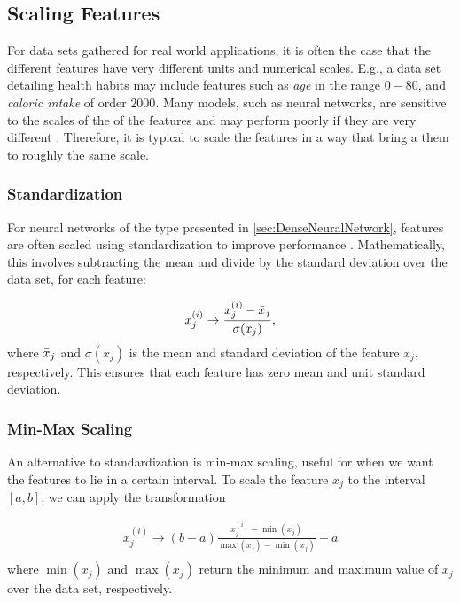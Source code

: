 \subsection{Scaling Features}\label{sec:Scaling Features}
For data sets gathered for real world applications, it is often the case that the different features have very different units and numerical scales. E.g., a data set detailing health habits may include features such as \emph{age} in the range $0-80$, and \emph{caloric intake} of order $2000$. Many models, such as neural networks, are sensitive to the scales of the of the features and may perform poorly if they are very different \cite{hands-on}. Therefore, it is typical to scale the features in a way that bring a them to roughly the same scale. 

\subsubsection*{Standardization}
For neural networks of the type presented in \cref{sec:DenseNeuralNetwork}, features are often scaled using standardization to improve performance \cite{LeCun2012}. Mathematically, this involves subtracting the mean and divide by the standard deviation over the data set, for each feature:

\begin{equation}
    x_j^{(i)} \rightarrow \frac{x_j^{(i)} - \Bar{x}_j}{\sigma(x_j)},
\end{equation}
where $\Bar{x}_j$ and $\sigma(x_j)$ is the mean and standard deviation of the feature $x_j$, respectively. This ensures that each feature has zero mean and unit standard deviation.

\subsubsection*{Min-Max Scaling}
An alternative to standardization is min-max scaling, useful for when we want the features to lie in a certain interval. To scale the feature $x_j$ to the interval $[a, b]$, we can apply the transformation

\begin{equation}
\begin{aligned}
    x_j^{(i)} \rightarrow (b-a)\frac{x_j^{(i)} - \min(x_j)}{\max(x_j) - \min(x_j)} - a\\
\end{aligned}  
\end{equation}
where $\min(x_j)$ and $\max(x_j)$ return the minimum and maximum value of $x_j$ over the data set, respectively.

